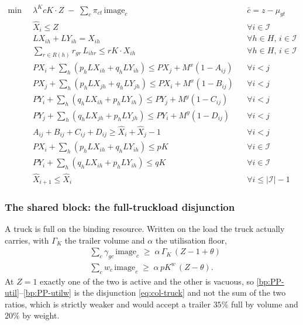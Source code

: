 \begin{align}
  \min\;\; & \lambda^{K}cK\cdot Z \;-\; \sum_{c}\pi_{ct}\,\mathrm{image}_{c}
    && \bar c = z-\mu_{gt} \label{bp:PP-objective}\\
  & \widehat{X}_{i} \le Z && \forall i \in \mathcal{I} \label{bp:PP-slot-active}\\
  & \mathit{LX}_{ih} + \mathit{LY}_{ih} = X_{ih}
    && \forall h \in H,\, i \in \mathcal{I} \label{bp:PP-orient}\\
  & \sum_{r \in R(h)} r_{gr}\,L_{ihr} \le \mathit{rK}\cdot X_{ih}
    && \forall h \in H,\, i \in \mathcal{I} \label{bp:PP-height}\\
  & \mathit{PX}_{i} + \sum_{h}(p_{h}\mathit{LX}_{ih}+q_{h}\mathit{LY}_{ih})
      \le \mathit{PX}_{j} + M^{x}(1-A_{ij})
    && \forall i<j \label{bp:PP-nonov-x1}\\
  & \mathit{PX}_{j} + \sum_{h}(p_{h}\mathit{LX}_{jh}+q_{h}\mathit{LY}_{jh})
      \le \mathit{PX}_{i} + M^{x}(1-B_{ij})
    && \forall i<j \label{bp:PP-nonov-x2}\\
  & \mathit{PY}_{i} + \sum_{h}(q_{h}\mathit{LX}_{ih}+p_{h}\mathit{LY}_{ih})
      \le \mathit{PY}_{j} + M^{y}(1-C_{ij})
    && \forall i<j \label{bp:PP-nonov-y1}\\
  & \mathit{PY}_{j} + \sum_{h}(q_{h}\mathit{LX}_{jh}+p_{h}\mathit{LY}_{jh})
      \le \mathit{PY}_{i} + M^{y}(1-D_{ij})
    && \forall i<j \label{bp:PP-nonov-y2}\\
  & A_{ij}+B_{ij}+C_{ij}+D_{ij} \ge \widehat{X}_{i}+\widehat{X}_{j}-1
    && \forall i<j \label{bp:PP-cover}\\
  & \mathit{PX}_{i} + \sum_{h}(p_{h}\mathit{LX}_{ih}+q_{h}\mathit{LY}_{ih})
      \le \mathit{pK} && \forall i \in \mathcal{I} \label{bp:PP-cont-x}\\
  & \mathit{PY}_{i} + \sum_{h}(q_{h}\mathit{LX}_{ih}+p_{h}\mathit{LY}_{ih})
      \le \mathit{qK} && \forall i \in \mathcal{I} \label{bp:PP-cont-y}\\
  & \widehat{X}_{i+1} \le \widehat{X}_{i}
    && \forall i \le |\mathcal{I}|-1 \label{bp:PP-sym}
\end{align}

\subsubsection*{The shared block: the full-truckload disjunction}

A truck is full on the binding resource. Written on the load the truck
actually carries, with $\Gamma_{K}$ the trailer volume and $\alpha$ the
utilisation floor,
\begin{align}
  & \sum_{c}\gamma_{gc}\,\mathrm{image}_{c}
      \;\ge\;\alpha\,\Gamma_{K}\,(Z-1+\theta) \label{bp:PP-util}\\
  & \sum_{c} w_{c}\,\mathrm{image}_{c}
      \;\ge\;\alpha\,\mathit{pK}^{w}\,(Z-\theta). \label{bp:PP-utilw}
\end{align}
At $Z=1$ exactly one of the two is active and the other is vacuous, so
\eqref{bp:PP-util}--\eqref{bp:PP-utilw} is the disjunction
\eqref{eq:col-truck} and not the sum of the two ratios, which is
strictly weaker and would accept a trailer $35\%$ full by volume and
$20\%$ by weight.

